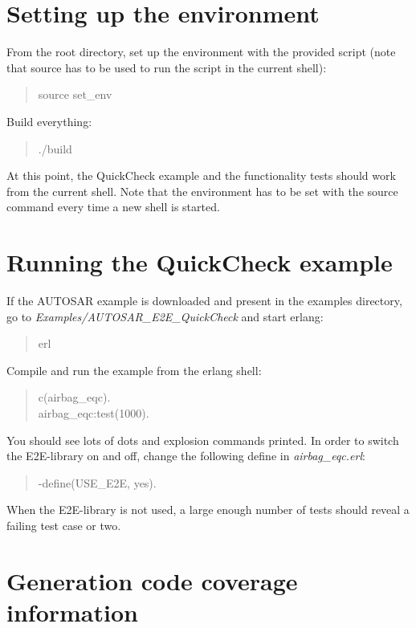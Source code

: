 \section{Setting up the environment}\label{setting-up-the-environment}

From the root directory, set up the environment with the provided script
(note that source has to be used to run the script in the current
shell):

\begin{quote}
source set\_env
\end{quote}

Build everything:

\begin{quote}
./build
\end{quote}

At this point, the QuickCheck example and the functionality tests should
work from the current shell. Note that the environment has to be set
with the source command every time a new shell is started.

\section{Running the QuickCheck
example}\label{running-the-quickcheck-example}

If the AUTOSAR example is downloaded and present in the examples
directory, go to \emph{Examples/AUTOSAR\_E2E\_QuickCheck} and start
erlang:

\begin{quote}
erl
\end{quote}

Compile and run the example from the erlang shell:

\begin{quote}
c(airbag\_eqc).\\airbag\_eqc:test(1000).
\end{quote}

You should see lots of dots and explosion commands printed. In order to
switch the E2E-library on and off, change the following define in
\emph{airbag\_eqc.erl}:

\begin{quote}
-define(USE\_E2E, yes).
\end{quote}

When the E2E-library is not used, a large enough number of tests should
reveal a failing test case or two.

\section{Generation code coverage
information}\label{generation-code-coverage-information}

